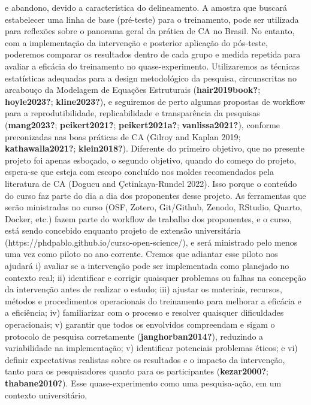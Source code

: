 \documentclass[
  a4paper,
]{article}
\begin{document}
e abandono, devido a característica do delineamento. A amostra que
buscará estabelecer uma linha de base (pré-teste) para o treinamento,
pode ser utilizada para reflexões sobre o panorama geral da prática de
CA no Brasil. No entanto, com a implementação da intervenção e posterior
aplicação do pós-teste, poderemos comparar os resultados dentro de cada
grupo e medida repetida para avaliar a eficácia do treinamento no
quase-experimento. Utilizaremos as técnicas estatísticas adequadas para
a design metodológico da pesquisa, circunscritas no arcabouço da
Modelagem de Equações Estruturais (\textbf{hair2019book?};
\textbf{hoyle2023?}; \textbf{kline2023?}), e seguiremos de perto algumas
propostas de workflow para a reprodutibilidade, replicabilidade e
transparência da pesquisas (\textbf{mang2023?}; \textbf{peikert2021?};
\textbf{peikert2021a?}; \textbf{vanlissa2021?}), conforme preconizadas
nas boas práticas de CA (Gilroy and Kaplan 2019;
\textbf{kathawalla2021?}; \textbf{klein2018?}). Diferente do primeiro
objetivo, que no presente projeto foi apenas esboçado, o segundo
objetivo, quando do começo do projeto, espera-se que esteja com escopo
concluído nos moldes recomendados pela literatura de CA (Dogucu and
Çetinkaya-Rundel 2022). Isso porque o conteúdo do curso faz parte do dia
a dia dos proponentes desse projeto. As ferramentas que serão
ministradas no curso (OSF, Zotero, Git/Github, Zenodo, RStudio, Quarto,
Docker, etc.) fazem parte do workflow de trabalho dos proponentes, e o
curso, está sendo concebido enquanto projeto de extensão universitária
(https://phdpablo.github.io/curso-open-science/), e será ministrado pelo
menos uma vez como piloto no ano corrente. Cremos que adiantar esse
piloto nos ajudará i) avaliar se a intervenção pode ser implementada
como planejado no contexto real; ii) identificar e corrigir quaisquer
problemas ou falhas na concepção da intervenção antes de realizar o
estudo; iii) ajustar os materiais, recursos, métodos e procedimentos
operacionais do treinamento para melhorar a eficácia e a eficiência; iv)
familiarizar com o processo e resolver quaisquer dificuldades
operacionais; v) garantir que todos os envolvidos compreendam e sigam o
protocolo de pesquisa corretamente (\textbf{janghorban2014?}), reduzindo
a variabilidade na implementação; v) identificar potenciais problemas
éticos; e vi) definir expectativas realistas sobre os resultados e o
impacto da intervenção, tanto para os pesquisadores quanto para os
participantes (\textbf{kezar2000?}; \textbf{thabane2010?}). Esse
quase-experimento como uma pesquisa-ação, em um contexto universitário,
\end{document}
